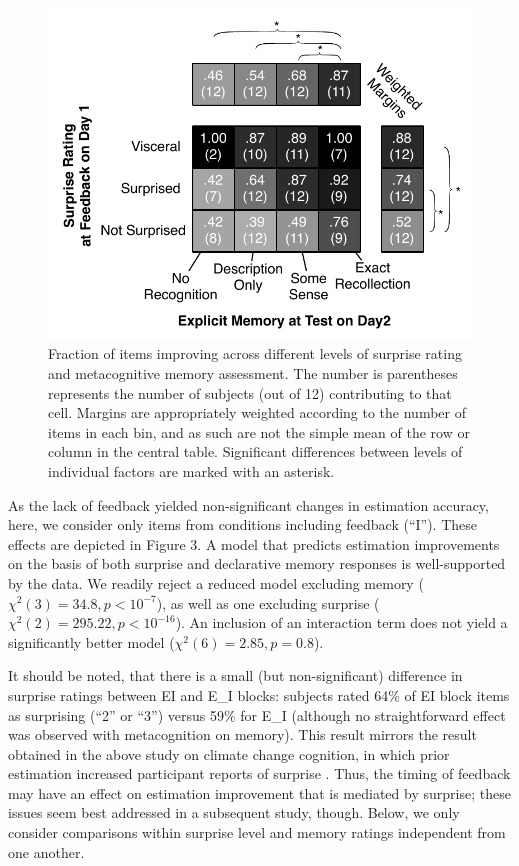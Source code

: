 \begin{figure}[h]
\centering
\includegraphics{shaded-table-reversals.pdf}
\caption{Fraction of items improving across different levels of surprise rating
and metacognitive memory assessment. The number is parentheses represents the
number of subjects (out of 12) contributing to that cell. Margins are
appropriately weighted according to the number of items in each bin, and as such
are not the simple mean of the row or column in the central table. Significant
differences between levels of individual factors are marked with an asterisk.}
\label{fig:ei-table} 
\end{figure}

As the lack of feedback yielded non-significant changes in estimation accuracy,
here, we consider only items from conditions including feedback (``I''). These
effects are depicted in Figure 3.  A model that predicts estimation improvements
on the basis of both surprise and declarative memory responses is well-supported
by the data. We readily reject a reduced model excluding memory ($\chi^2(3) =
34.8, p < 10^{-7}$), as well as one excluding surprise ($\chi^2(2) = 295.22, p <
10^{-16}$). An inclusion of an interaction term does not yield a significantly
better model ($\chi^2(6) = 2.85, p = 0.8$). 

It should be noted, that there is a small (but non-significant)
difference in surprise ratings between EI and E\_I blocks: subjects rated 64\%
of EI block items as surprising (``2'' or ``3'') versus 59\% for E\_I (although no
straightforward effect was observed with metacognition on memory).  This result
mirrors the result obtained in the above study on climate change cognition, in
which prior estimation increased participant reports of surprise
\parencite[cf.][]{rinne_estimation_2006}.  Thus, the
timing of feedback may have an effect on estimation improvement that is mediated
by surprise; these issues seem best addressed in a subsequent study, though.
Below, we only consider comparisons within surprise level and memory ratings
independent from one another.

